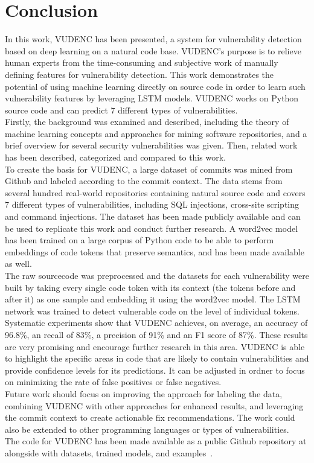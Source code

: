 \documentclass[
a4paper,
pagesize,
pdftex,
12pt,
twoside, %
BCOR=5mm, %
ngerman,
fleqn,
final,
]{scrartcl}
\begin{document}
	
	
	
	
	
	
	\newpage
	\setcounter{secnumdepth}{0} %
	\section{Conclusion}
	In this work, VUDENC has been presented, a system for vulnerability detection based on deep learning on a natural code base. VUDENC's purpose is to relieve human experts from the time-consuming and subjective work of manually defining features for vulnerability detection. This work demonstrates the potential of using machine learning directly on source code in order to learn such vulnerability features by leveraging LSTM models. VUDENC works on Python source code and can predict 7 different types of vulnerabilities.\\
	Firstly, the background was examined and described, including the theory of machine learning concepts and approaches for mining software repositories, and a brief overview for several security vulnerabilities was given. Then, related work has been described, categorized and compared to this work.\\
	To create the basis for VUDENC, a large dataset of commits was mined from Github and labeled according to the commit context. The data stems from several hundred real-world repositories containing natural source code and covers 7 different types of vulnerabilities, including SQL injections, cross-site scripting and command injections. The dataset has been made publicly available and can be used to replicate this work and conduct further research. A word2vec model has been trained on a large corpus of Python code to be able to perform embeddings of code tokens that preserve semantics, and has been made available as well.\\
	The raw sourcecode was preprocessed and the datasets for each vulnerability were built by taking every single code token with its context (the tokens before and after it) as one sample and embedding it using the word2vec model. The LSTM network was trained to detect vulnerable code on the level of individual tokens.\\
	Systematic experiments show that VUDENC achieves, on average, an accuracy of 96.8\%, an recall of 83\%, a precision of 91\% and an F1 score of 87\%.  These results are very promising and encourage further research in this area. VUDENC is able to highlight the specific areas in code that are likely to contain vulnerabilities and provide confidence levels for its predictions. It can be adjusted in ordner to focus on minimizing the rate of false positives or false negatives. \\
	Future work should focus on improving the approach for labeling the data, combining VUDENC with other approaches for enhanced results, and leveraging the commit context to create actionable fix recommendations. The work could also be extended to other programming languages or types of vulnerabilities.\\
	The code for VUDENC has been made available as a public Github repository at alongside with datasets, trained models, and examples~\cite{Wartschinski.2.12.2019}.
		
\end{document}
